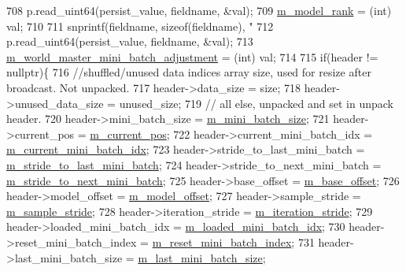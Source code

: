 \begin{DoxyCode}
{{{{{{{{{{{{{{{{{{{{{708     p.read\_uint64(persist\_value, fieldname, &val);
709     \hyperlink{classlbann_1_1generic__data__reader_a5e89d5e6797f7e7b69d1a64f7d8b5d6b}{m\_model\_rank} = (int) val;
710 
711     snprintf(fieldname, \textcolor{keyword}{sizeof}(fieldname), \textcolor{stringliteral}{"%
712     p.read\_uint64(persist\_value, fieldname, &val);    
713     \hyperlink{classlbann_1_1generic__data__reader_acd33b2dbdfd4043ecc62cc13789532a2}{m\_world\_master\_mini\_batch\_adjustment} = (int) val;
714     
715     \textcolor{keywordflow}{if}(header != \textcolor{keyword}{nullptr})\{
716       \textcolor{comment}{//shuffled/unused data indices array size, used for resize after broadcast. Not unpacked.}
717       header->data\_size = size;
718       header->unused\_data\_size = unused\_size;
719       \textcolor{comment}{// all else, unpacked and set in unpack header.}
720       header->mini\_batch\_size = \hyperlink{classlbann_1_1generic__data__reader_a96f87a7d09711ab3eee3940ff2aa36ec}{m\_mini\_batch\_size};
721       header->current\_pos = \hyperlink{classlbann_1_1generic__data__reader_a2facf4e410099ac8c1fa586e797ec2e0}{m\_current\_pos};
722       header->current\_mini\_batch\_idx = \hyperlink{classlbann_1_1generic__data__reader_aefd4bc0bf95de1e2500827581acf3536}{m\_current\_mini\_batch\_idx};
723       header->stride\_to\_last\_mini\_batch = \hyperlink{classlbann_1_1generic__data__reader_ac46922f2ef4f392bcc7c59c21685a3ff}{m\_stride\_to\_last\_mini\_batch};
724       header->stride\_to\_next\_mini\_batch = \hyperlink{classlbann_1_1generic__data__reader_a02c4632cc7cad5c3e4062934c41717a0}{m\_stride\_to\_next\_mini\_batch};
725       header->base\_offset = \hyperlink{classlbann_1_1generic__data__reader_a77946c4dca753c23f39e9a490eba1229}{m\_base\_offset};
726       header->model\_offset = \hyperlink{classlbann_1_1generic__data__reader_a5d9a0efd1ebe43a74911c35ffe84edc9}{m\_model\_offset};
727       header->sample\_stride = \hyperlink{classlbann_1_1generic__data__reader_a58461c39de7e17eafc5b98aec99cbb9b}{m\_sample\_stride};
728       header->iteration\_stride = \hyperlink{classlbann_1_1generic__data__reader_a73b23a2e7768db4e9e8ba4d9a362163a}{m\_iteration\_stride};
729       header->loaded\_mini\_batch\_idx = \hyperlink{classlbann_1_1generic__data__reader_a2cfc5a3e6de8a8a24d3525ec3ed586fb}{m\_loaded\_mini\_batch\_idx};
730       header->reset\_mini\_batch\_index = \hyperlink{classlbann_1_1generic__data__reader_af29f62579a408d1548a124442bcf181d}{m\_reset\_mini\_batch\_index};
731       header->last\_mini\_batch\_size = \hyperlink{classlbann_1_1generic__data__reader_a241f77b6209de4ae656bc34ad51bb612}{m\_last\_mini\_batch\_size};
}}}}}}}}}}}}}}}}}}}}}}
\end{DoxyCode}
